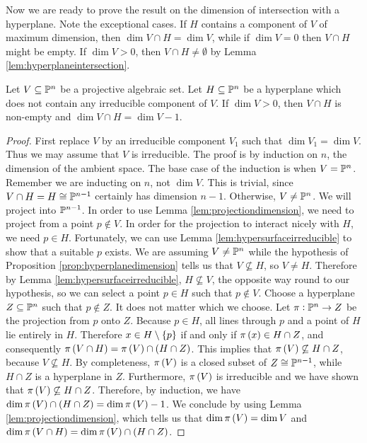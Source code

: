 Now we are ready to prove the result on the dimension of intersection with a hyperplane. Note the exceptional cases. If $ H $ contains a component of $ V $ of maximum dimension, then $ \dim V \cap H = \dim V $, while if $ \dim V = 0 $ then $ V \cap H $ might be empty. If $ \dim V > 0 $, then $ V \cap H \ne \emptyset $ by Lemma \ref{lem:hyperplaneintersection}.

\begin{proposition}
\label{prop:hyperplanedimension}
Let $ V \subseteq \mathbb{P}^n $ be a projective algebraic set. Let $ H \subseteq \mathbb{P}^n $ be a hyperplane which does not contain any irreducible component of $ V $. If $ \dim V > 0 $, then $ V \cap H $ is non-empty and $ \dim V \cap H = \dim V - 1 $.
\end{proposition}

\begin{proof}
First replace $ V $ by an irreducible component $ V_1 $ such that $ \dim V_1 = \dim V $. Thus we may assume that $ V $ is irreducible. The proof is by induction on $ n $, the dimension of the ambient space. The base case of the induction is when $ V = \mathbb{P}^n $. Remember we are inducting on $ n $, not $ \dim V $. This is trivial, since $ V \cap H = H \cong \mathbb{P}^{n - 1} $ certainly has dimension $ n - 1 $. Otherwise, $ V \ne \mathbb{P}^n $. We will project into $ \mathbb{P}^{n - 1} $. In order to use Lemma \ref{lem:projectiondimension}, we need to project from a point $ p \notin V $. In order for the projection to interact nicely with $ H $, we need $ p \in H $. Fortunately, we can use Lemma \ref{lem:hypersurfaceirreducible} to show that a suitable $ p $ exists. We are assuming $ V \ne \mathbb{P}^n $ while the hypothesis of Proposition \ref{prop:hyperplanedimension} tells us that $ V \not\subseteq H $, so $ V \ne H $. Therefore by Lemma \ref{lem:hypersurfaceirreducible}, $ H \not\subseteq V $, the opposite way round to our hypothesis, so we can select a point $ p \in H $ such that $ p \notin V $. Choose a hyperplane $ Z \subseteq \mathbb{P}^n $ such that $ p \notin Z $. It does not matter which we choose. Let $ \pi : \mathbb{P}^n \to Z $ be the projection from $ p $ onto $ Z $. Because $ p \in H $, all lines through $ p $ and a point of $ H $ lie entirely in $ H $. Therefore $ x \in H \setminus \cbr{p} $ if and only if $ \pi\br{x} \in H \cap Z $, and consequently $ \pi\br{V \cap H} = \pi\br{V} \cap \br{H \cap Z} $. This implies that $ \pi\br{V} \not\subseteq H \cap Z $, because $ V \not\subseteq H $. By completeness, $ \pi\br{V} $ is a closed subset of $ Z \cong \mathbb{P}^{n - 1} $, while $ H \cap Z $ is a hyperplane in $ Z $. Furthermore, $ \pi\br{V} $ is irreducible and we have shown that $ \pi\br{V} \not\subseteq H \cap Z $. Therefore, by induction, we have $ \dim \pi\br{V} \cap \br{H \cap Z} = \dim \pi\br{V} - 1 $. We conclude by using Lemma \ref{lem:projectiondimension}, which tells us that $ \dim \pi\br{V} = \dim V $ and $ \dim \pi\br{V \cap H} = \dim \pi\br{V} \cap \br{H \cap Z} $.
\end{proof}

